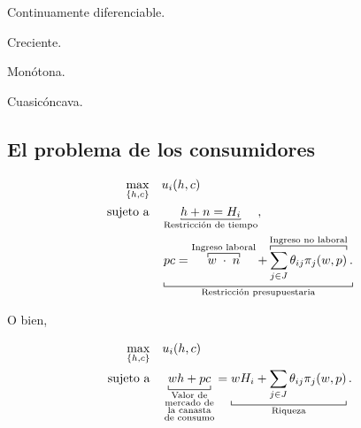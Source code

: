 \documentclass[8pt,a4paper]{extarticle}
\begin{document}
\begin{multicols}{3}
	\begin{eqlist}
		\item Continuamente diferenciable.
		\item Creciente.
		\item Monótona.
		\item Cuasicóncava.
	\end{eqlist}

	\subsection{El problema de los consumidores}

	\begin{equation*}
		\begin{aligned}
			\max_{\{h, c\}} \quad & u_i(h, c)                                                                                                                                                                                                                                                     \\
			\text{sujeto a} \quad & \underbracket[0.5pt][0.5pt]{h + n = H_i}_{\text{\normalfont Restricción de tiempo}},                                                                                                                                                                          \\
			                      & \underbracket[0.5pt]{pc = \overbracket[0.5pt]{w \; \cdot \;  n}^{\text{\normalfont Ingreso laboral}} + \overbracket[0.5pt]{\sum_{j \in J} \theta_{ij} \pi_j (w, p)}^{\text{\normalfont Ingreso no laboral}}.}_{\text{\normalfont Restricción presupuestaria}}
		\end{aligned}
	\end{equation*}

	O bien,

	\begin{equation*}
		\begin{aligned}
			\max_{\{h, c\}} \quad & u_i(h, c)                                                            \\
			\text{sujeto a} \quad & \underbracket[0.5pt]{wh + pc}_{\substack{\text{\normalfont Valor de} \\ \text{\normalfont mercado de} \\ \text{\normalfont la canasta} \\\text{\normalfont de consumo} }} = \underbracket[0.5pt]{wH_i + \sum_{j \in J} \theta_{ij} \pi_j (w, p)}_{\text{\normalfont Riqueza}}.
		\end{aligned}
	\end{equation*}


\end{multicols}
\end{document}
